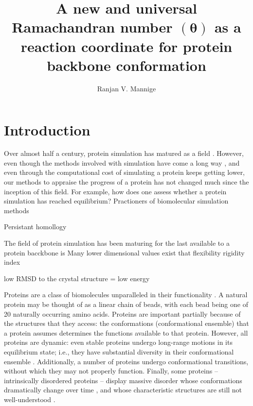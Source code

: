 \documentclass[fleqn,10pt]{wlpeerj} %
\title{A new and universal Ramachandran number $(\bm{\theta})$ as a reaction coordinate for protein backbone conformation}
\author[1,*]{Ranjan V. Mannige}
\affil[1]{~Multiscale Institute, Redwood City, CA, U.S.A.}
\affil[*]{~ranjanmannige@lbl.gov}
\begin{document}
\flushbottom
\maketitle
\thispagestyle{empty}

\section*{Introduction}

Over almost half a century, protein simulation has matured as a field \citep{Levitt1976,Karplus2014,Levitt2014,Warshel2014,Nussinov2014}. However, even though the methods involved with simulation have come a long way \citep{Frenkel2002,Jorgensen2013,Hirst2014}, and even through the computational cost of simulating a protein keeps getting lower, our methods to appraise the progress of a protein has not changed much since the inception of this field. For example, how does one assess whether a protein simulation has reached equilibrium? Practioners of biomolecular simulation methods 



Persistant homollogy \cite{Cang2015}


The field of protein simulation has been maturing for the last available to a protein bacckbone is Many lower dimensional values exist that 
flexibility rigidity index \cite{Xia2013,Opron2014,Opron2015}

low RMSD to the crystal structure = low energy \cite{Nishikawa1972,Levitt1976,Levitt1983,Levitt1983a,Rasse1974,Ooi1978,Cohen1980,Maiorov1994}



Proteins are a class of biomolecules unparalleled in their functionality \citep{Berg2006}. A natural protein may be thought of as a linear chain of beads, with each bead being one of 20 naturally occurring amino acids. 
Proteins are important partially because of the structures that they access: the conformations (conformational ensemble) that a protein assumes determines the functions available to that protein. However, all proteins are dynamic: even stable proteins undergo long-range motions in its equilibrium state; i.e., they have substantial diversity in their conformational ensemble \citep{Mannige2014b}. Additionally, a number of proteins undergo conformational transitions, without which they may not properly function. Finally, some proteins -- intrinsically disordered proteins -- display massive disorder whose conformations dramatically change over time \citep{Uversky2003, Fink2005, Midic2009, Espinoza-Fonseca2009, Uversky2010, Tompa2011, Sibille2012, Kosol2013, Dunker2013, Geist2013, Baruah2015}, and whose characteristic structures are still not well-understood \citep{Beck2008}.
\end{document}
